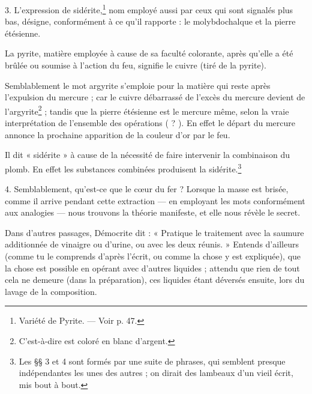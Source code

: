 \documentclass[landscape, a4paper, 11pt, oneside, polutonikogreek, french]{article}
\begin{document}
3. L'expression de sidérite,\footnote{Variété de Pyrite. --- Voir p. 47.} nom employé aussi par ceux qui sont signalés plus bas, désigne, conformément à ce qu'il rapporte : le molybdochalque et la pierre étésienne.

La pyrite, matière employée à cause de sa faculté colorante, après qu'elle a été brûlée ou soumise à l'action du feu, signifie le cuivre (tiré de la pyrite).

Semblablement le mot argyrite s'emploie pour la matière qui reste après l'expulsion du mercure ; car le cuivre débarrassé de l'excès du mercure devient de l'argyrite\footnote{C'est-à-dire est coloré en blanc d'argent.} ; tandis que la pierre étésienne est le mercure même, selon la vraie interprétation de l'ensemble des opérations ( ? ). En effet le départ du mercure annonce la prochaine apparition de la couleur d'or par le feu.

Il dit « sidérite » à cause de la nécessité de faire intervenir la combinaison du plomb. En effet les substances combinées produisent la sidérite.\footnote{Les §§ 3 et 4 sont formés par une suite de phrases, qui semblent presque indépendantes les unes des autres ; on dirait des lambeaux d'un vieil écrit, mis bout à bout.}

4. Semblablement, qu'est-ce que le cœur du fer ? Lorsque la masse est brisée, comme il arrive pendant cette extraction --- en employant les mots conformément aux analogies --- nous trouvons la théorie manifeste, et elle nous révèle le secret.

Dans d'autres passages, Démocrite dit : « Pratique le traitement avec la saumure additionnée de vinaigre ou d'urine, ou avec les deux réunis. » Entends d'ailleurs (comme tu le comprends d'après l'écrit, ou comme la chose y est expliquée), que la chose est possible en opérant avec d'autres liquides ; attendu que rien de tout cela ne demeure (dans la préparation), ces liquides étant déversés ensuite, lors du lavage de la composition.
\end{document}
